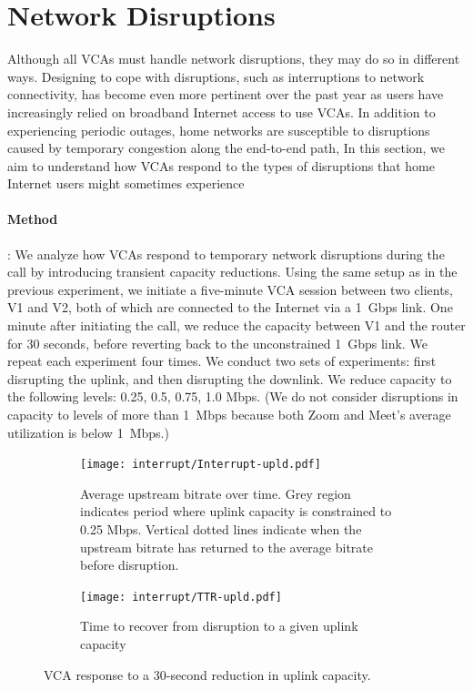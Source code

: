\section{Network Disruptions}
\label{sec:interruption}

Although all VCAs must handle network disruptions,  they may 
do so in different ways.
Designing to cope with disruptions, such as interruptions to network
connectivity, has become even more pertinent over the past year as users have
increasingly relied on broadband Internet access to use VCAs.
In addition to experiencing periodic outages, home networks are susceptible to disruptions caused by temporary congestion along the end-to-end path, 
 In this section, we aim to understand how VCAs respond to the types of disruptions that home Internet users might sometimes experience


\paragraph{Method}:
We analyze how
VCAs respond to temporary network disruptions during the call by introducing
transient capacity reductions. Using the same setup as in
the previous experiment, we initiate a five-minute VCA session between
two clients, V1 and V2, both of which are connected to the Internet via a
1~Gbps link. One minute after initiating the call, we reduce the capacity
between V1 and the router for 30 seconds, before reverting back to the
unconstrained 1~Gbps link. We repeat each experiment four times.
We conduct two sets of experiments: first disrupting the uplink, and then
disrupting the downlink. We reduce capacity to the following
levels: {0.25, 0.5, 0.75, 1.0} Mbps. (We do not consider disruptions in capacity
to levels of more than 1~Mbps because both Zoom and Meet's average utilization
is below 1~Mbps.)

\begin{figure}[t!]
\centering
\begin{subfigure}[t]{.5\textwidth}
    \centering
    \texttt{[image: interrupt/Interrupt-upld.pdf]}
    \caption{Average upstream bitrate over time. Grey region indicates period where uplink capacity is constrained to 0.25 Mbps. Vertical dotted lines indicate when the upstream bitrate has returned to the average bitrate before disruption.}
    \label{fig:ts_upld}
\end{subfigure}\hfill
\begin{subfigure}[t]{.5\textwidth}
      \centering
    \texttt{[image: interrupt/TTR-upld.pdf]}
    \caption{Time to recover from disruption to a given uplink capacity}
    \label{fig:TTR_upld}
\end{subfigure}
\caption{VCA response to a 30-second reduction in uplink capacity.}
\label{fig:interrupt-upld}
\end{figure}

